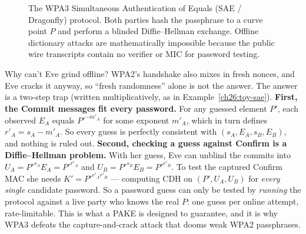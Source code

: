 \begin{figure}[H]
\caption{The WPA3 Simultaneous Authentication of Equals (SAE / Dragonfly) protocol. Both parties hash
the passphrase to a curve point $P$ and perform a blinded Diffie--Hellman exchange. Offline dictionary
attacks are mathematically impossible because the public wire transcripts contain no verifier or MIC for password testing.}
\label{ch26:fig-sae}
\end{figure}

\begin{whybox}
Why can't Eve grind offline? WPA2's handshake also mixes in fresh nonces, and Eve
cracks it anyway, so ``fresh randomness'' alone is not the answer. The answer is a
two-step trap (written multiplicatively, as in Example~\ref{ch26:toy-sae}).
\textbf{First, the Commit messages fit every password.} For any guessed element $P'$,
each observed $E_A$ equals $P'^{-m'_A}$ for some exponent $m'_A$, which in turn defines
$r'_A = s_A - m'_A$. So every guess is perfectly consistent with $(s_A, E_A, s_B, E_B)$,
and nothing is ruled out. \textbf{Second, checking a guess against Confirm is a
Diffie--Hellman problem.} With her guess, Eve can unblind the commits into
$U_A = P'^{s_A} E_A = P'^{r'_A}$ and $U_B = P'^{s_B} E_B = P'^{r'_B}$. To test the
captured Confirm MAC she needs $K' = P'^{r'_A r'_B}$ --- computing CDH on
$(P', U_A, U_B)$ for \emph{every single} candidate password. So a password guess can only be tested by \emph{running} the
protocol against a live party who knows the real $P$: one guess per online
attempt, rate-limitable. This is what a PAKE is designed to guarantee, and it is why WPA3
defeats the capture-and-crack attack that dooms weak WPA2 passphrases.
\end{whybox}

